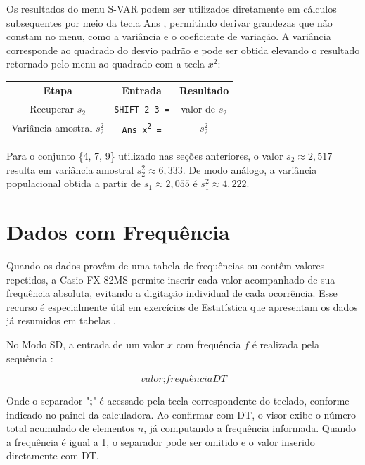 Os resultados do menu S-VAR podem ser utilizados diretamente em cálculos subsequentes por meio da tecla Ans \cite{casio2004}, permitindo derivar grandezas que não constam no menu, como a variância e o coeficiente de variação. A variância corresponde ao quadrado do desvio padrão e pode ser obtida elevando o resultado retornado pelo menu ao quadrado com a tecla $x^2$:

\begin{table}[H]
    \centering
    \begin{tabular}{|c|c|c|}
        \hline
        \textbf{Etapa} & \textbf{Entrada} & \textbf{Resultado} \\ \hline
        Recuperar $s_2$ & \texttt{SHIFT 2 3 =}  & valor de $s_2$ \\
        Variância amostral $s_2^2$ & \texttt{Ans x\textsuperscript{2} =} & $s_2^2$ \\ \hline
    \end{tabular}
\end{table}

Para o conjunto \{4, 7, 9\} utilizado nas seções anteriores, o valor $s_2 \approx 2{,}517$ resulta em variância amostral $s_2^2 \approx 6{,}333$. De modo análogo, a variância populacional obtida a partir de $s_1 \approx 2{,}055$ é $s_1^2 \approx 4{,}222$.

\section{Dados com Frequência}

Quando os dados provêm de uma tabela de frequências ou contêm valores repetidos, a Casio FX-82MS permite inserir cada valor acompanhado de sua frequência absoluta, evitando a digitação individual de cada ocorrência. Esse recurso é especialmente útil em exercícios de Estatística que apresentam os dados já resumidos em tabelas \cite{casio2004}.

No Modo SD, a entrada de um valor $x$ com frequência $f$ é realizada pela sequência \cite{casio2004}:

\[
    \textit{valor} \textbf{;} \textit{frequência} DT
\]

Onde o separador "\textbf{;}" é acessado pela tecla correspondente do teclado, conforme indicado no painel da calculadora. Ao confirmar com DT, o visor exibe o número total acumulado de elementos $n$, já computando a frequência informada. Quando a frequência é igual a 1, o separador pode ser omitido e o valor inserido diretamente com DT.

